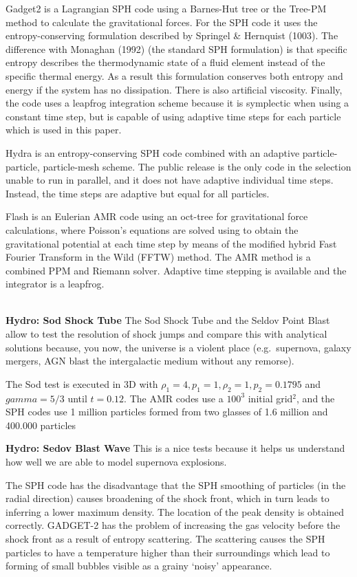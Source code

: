 \documentclass[MScProj_TLRH_ClusterEnergy.tex]{subfiles}
\begin{document}
Gadget2 is a Lagrangian SPH code using a Barnes-Hut tree or the Tree-PM method to calculate the gravitational forces. For the SPH code it uses the entropy-conserving formulation described by Springel \& Hernquist (1003). The difference with Monaghan (1992) (the standard SPH formulation) is that specific entropy describes the thermodynamic state of a fluid element instead of the specific thermal energy. As a result this formulation conserves both entropy and energy if the system has no dissipation. There is also artificial viscosity. Finally, the code uses a leapfrog integration scheme because it is symplectic when using a constant time step, but is capable of using adaptive time steps for each particle which is used in this paper.

Hydra is an entropy-conserving SPH code combined with an adaptive particle-particle, particle-mesh scheme. The public release is the only code in the selection unable to run in parallel, and it does not have adaptive individual time steps. Instead, the time steps are adaptive but equal for all particles.

Flash is an Eulerian AMR code using an oct-tree for gravitational force calculations, where Poisson's equations are solved using to obtain the gravitational potential at each time step by means of the modified hybrid Fast Fourier Transform in the Wild (FFTW) method. The AMR method is a combined PPM and Riemann solver. Adaptive time stepping is available and the integrator is a leapfrog.

\\
\textbf{Hydro: Sod Shock Tube}
The Sod Shock Tube and the Seldov Point Blast allow to test the resolution of shock jumps and compare this with analytical solutions because, you now, the universe is a violent place (e.g.\ supernova, galaxy mergers, AGN blast the intergalactic medium without any remorse).

The Sod test is executed in 3D with $\rho_1 = 4, p_1 = 1, \rho_2 = 1, p_2 = 0.1795$ and $gamma = 5/3$ until $t=0.12$. The AMR codes use a $100^3$ initial grid$^2$, and the SPH codes use 1 million particles formed from two glasses of 1.6 million and 400.000 particles

\textbf{Hydro: Sedov Blast Wave}
This is a nice tests because it helps us understand how well we are able to model supernova explosions.

The SPH code has the disadvantage that the SPH smoothing of particles (in the radial direction) causes broadening of the shock front, which in turn leads to inferring a lower maximum density. The location of the peak density is obtained correctly. GADGET-2 has the problem of increasing the gas velocity before the shock front as a result of entropy scattering. The scattering causes the SPH particles to have a temperature higher than their surroundings which lead to forming of small bubbles visible as a grainy `noisy' appearance.
\end{document}
